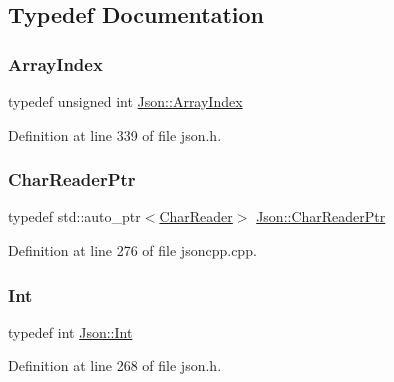 \subsection{Typedef Documentation}
\mbox{\label{namespace_json_a8048e741f2177c3b5d9ede4a5b8c53c2}} 
\subsubsection{\texorpdfstring{Array\+Index}{ArrayIndex}}
{\footnotesize\ttfamily typedef unsigned int \hyperlink{namespace_json_a8048e741f2177c3b5d9ede4a5b8c53c2}{Json\+::\+Array\+Index}}



Definition at line 339 of file json.\+h.

\mbox{\label{namespace_json_a4724efb8d41614b47036cb8b54233837}} 
\subsubsection{\texorpdfstring{Char\+Reader\+Ptr}{CharReaderPtr}}
{\footnotesize\ttfamily typedef std\+::auto\+\_\+ptr$<$\hyperlink{class_json_1_1_char_reader}{Char\+Reader}$>$ \hyperlink{namespace_json_a4724efb8d41614b47036cb8b54233837}{Json\+::\+Char\+Reader\+Ptr}}



Definition at line 276 of file jsoncpp.\+cpp.

\mbox{\label{namespace_json_a08122e8005b706d982e48cca1e2119c7}} 
\subsubsection{\texorpdfstring{Int}{Int}}
{\footnotesize\ttfamily typedef int \hyperlink{namespace_json_a08122e8005b706d982e48cca1e2119c7}{Json\+::\+Int}}



Definition at line 268 of file json.\+h.

\mbox{\label{namespace_json_ac62566f36fd33115957b91305c9ed1dc}} 
